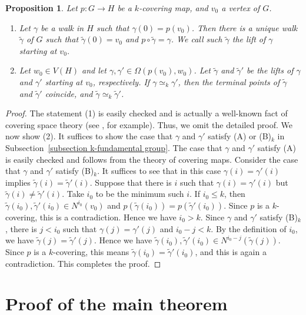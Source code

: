 \documentclass[11pt, amsfonts]{amsart}
\numberwithin{equation}{section}
\newtheorem{proposition}[thm]{Proposition}
\theoremstyle{definition}
\theoremstyle{remark}
\newcommand{\tgamma}{\tilde{\gamma}}
\begin{document}
\begin{proposition} \label{proposition lifting}
Let $p \colon G \to H$ be a $k$-covering map, and $v_0$ a vertex of $G$.
\begin{enumerate}[(1)]
\item Let $\gamma$ be a walk in $H$ such that $\gamma(0) = p(v_0)$. Then there is a unique walk $\tgamma$ of $G$ such that $\tgamma(0) = v_0$ and $p \circ \tgamma = \gamma$. We call such $\tgamma$ the \emph{lift} of $\gamma$ starting at $v_0$.

\item Let $w_0 \in V(H)$ and let $\gamma, \gamma' \in \Omega(p(v_0), w_0)$. Let $\tgamma$ and $\tgamma'$ be the lifts of $\gamma$ and $\gamma'$ starting at $v_0$, respectively. If $\gamma \simeq_k \gamma'$, then the terminal points of $\tgamma$ and $\tgamma'$ coincide, and $\tgamma \simeq_k \tgamma'$.
\end{enumerate}
\end{proposition}
\begin{proof}
The statement (1) is easily checked and is actually a well-known fact of covering space theory (see \cite[Section~1.1]{Hatcher}, for example). Thus, we omit the detailed proof. We now show (2). It suffices to show the case that $\gamma$ and $\gamma'$ satisfy (A) or (B)$_k$ in Subsection~\ref{subsection k-fundamental group}. The case that $\gamma$ and $\gamma'$ satisfy (A) is easily checked and follows from the theory of covering maps. Consider the case that $\gamma$ and $\gamma'$ satisfy (B)$_k$. It suffices to see that in this case $\gamma(i) = \gamma'(i)$ implies $\tgamma(i) = \tgamma'(i)$. Suppose that there is $i$ such that $\gamma(i) = \gamma'(i)$ but $\tgamma(i) \ne \tgamma'(i)$. Take $i_0$ to be the  minimum such $i$. If $i_0 \le k$, then $\tgamma(i_0), \tgamma'(i_0) \in N^{i_0}(v_0)$ and $p(\tgamma(i_0)) = p(\tgamma'(i_0))$. Since $p$ is a $k$-covering, this is a contradiction. Hence we have $i_0 > k$. Since $\gamma$ and $\gamma'$ satisfy (B)$_k$, there is $j < i_0$ such that $\gamma(j) = \gamma'(j)$ and $i_0 - j < k$. By the definition of $i_0$, we have $\tgamma(j) = \tgamma'(j)$. Hence we have $\tgamma(i_0), \tgamma'(i_0) \in N^{i_0 - j}(\tgamma(j))$. Since $p$ is a $k$-covering, this means $\tgamma(i_0) = \tgamma'(i_0)$, and this is again a contradiction. This completes the proof.
\end{proof}



\section{Proof of the main theorem} \label{section Proof}
\end{document}
